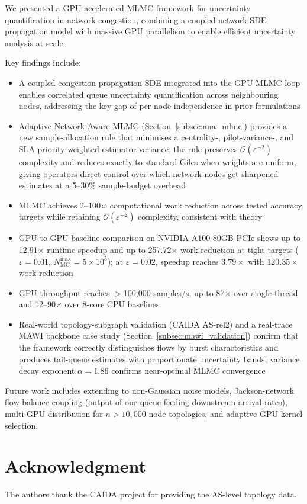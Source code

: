 \documentclass[pdflatex,sn-mathphys-num]{sn-jnl}
\theoremstyle{thmstyleone}%
\theoremstyle{thmstyletwo}%
\theoremstyle{thmstylethree}%
\begin{document}
We presented a GPU-accelerated MLMC framework for uncertainty quantification in network
congestion, combining a coupled network-SDE propagation model with massive GPU parallelism to
enable efficient uncertainty analysis at scale.

Key findings include:
\begin{itemize}
    \item A coupled congestion propagation SDE integrated into the GPU-MLMC loop enables
    correlated queue uncertainty quantification across neighbouring nodes, addressing the key gap
    of per-node independence in prior formulations
    \item Adaptive Network-Aware MLMC (Section~\ref{subsec:ana_mlmc}) provides a new
    sample-allocation rule that minimises a centrality-, pilot-variance-, and
    SLA-priority-weighted estimator variance; the rule preserves $\mathcal{O}(\varepsilon^{-2})$
    complexity and reduces exactly to standard Giles when weights are uniform, giving operators
    direct control over which network nodes get sharpened estimates at a 5--30\% sample-budget
    overhead
    \item MLMC achieves 2--100$\times$ computational work reduction across tested accuracy
    targets while retaining $\mathcal{O}(\varepsilon^{-2})$ complexity, consistent with theory
    \cite{giles2015multilevel}
    \item GPU-to-GPU baseline comparison on NVIDIA A100 80GB PCIe shows up to 12.91$\times$
    runtime speedup and up to 257.72$\times$ work reduction at tight targets ($\varepsilon=0.01$,
    $N_\text{MC}^\text{max}=5\times10^5$); at $\varepsilon=0.02$, speedup reaches $3.79\times$
    with $120.35\times$ work reduction
    \item GPU throughput reaches $>$100,000 samples/s; up to 87$\times$ over single-thread and
    12--90$\times$ over 8-core CPU baselines
    \item Real-world topology-subgraph validation (CAIDA AS-rel2) and a real-trace MAWI backbone
    case study (Section~\ref{subsec:mawi_validation}) confirm that the framework correctly
    distinguishes flows by burst characteristics and produces tail-queue estimates with
    proportionate uncertainty bands; variance decay exponent $\alpha = 1.86$ confirms near-optimal
    MLMC convergence
\end{itemize}

Future work includes extending to non-Gaussian noise models, Jackson-network flow-balance
coupling (output of one queue feeding downstream arrival rates), multi-GPU distribution for
$n > 10{,}000$ node topologies, and adaptive GPU kernel selection.

\section*{Acknowledgment}

The authors thank the CAIDA project for providing the AS-level topology data.


\end{document}
